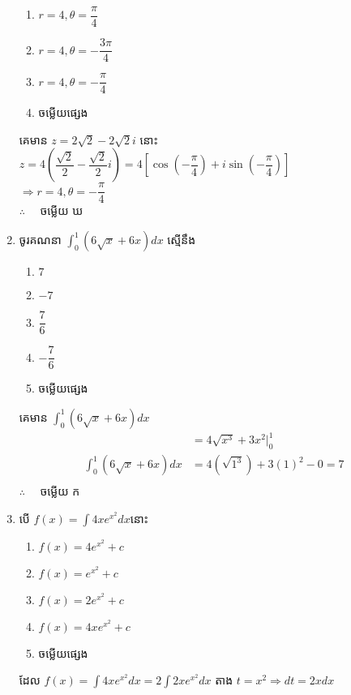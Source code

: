 \documentclass[a4paper,12pt]{article}
\begin{document}
\begin{enumerate}[m]
\begin{enumerate}[k,3]
			\item $r=4,\theta=\dfrac{\pi}{4}$
			\item $r=4,\theta=-\dfrac{3\pi}{4}$
			\item $r=4,\theta=-\dfrac{\pi}{4}$
			\item ចម្លើយផ្សេង
		\end{enumerate}
		\answer
		\begin{center}
			គេមាន $z=2\sqrt{2}-2\sqrt{2}i$ នោះ $z=4\left(\dfrac{\sqrt{2}}{2}-\dfrac{\sqrt{2}}{2}i\right)=4\left[\cos\left(-\dfrac{\pi}{4}\right)+i\sin\left(-\dfrac{\pi}{4}\right)\right]$\\
			$\Rightarrow r=4, \theta=-\dfrac{\pi}{4}$\\
			$\therefore \quad$ \kml ចម្លើយ \kbk ឃ
		\end{center}
		{\color{blue}\hrulefill}
	\item ចូរគណនា $\int_{0}^{1}\left(6\sqrt{x}+6x\right)dx$ ស្មើនឹង
	\begin{enumerate}[k,5]
		\item $7$
		\item $-7$
		\item $\dfrac{7}{6}$
		\item $-\dfrac{7}{6}$
		\item ចម្លើយផ្សេង
	\end{enumerate}
	\answer
	\begin{center}
		គេមាន $\int_{0}^{1}\left(6\sqrt{x}+6x\right)dx$\\
		\begin{align*}
			&=4\sqrt{x^3}+3x^2\bigg|_{0}^{1}\\
			\int_{0}^{1}\left(6\sqrt{x}+6x\right)dx&=4\left(\sqrt{1^3}\right)+3\left(1\right)^2-0=7\\
		\end{align*}
		$\therefore \quad$ \kml ចម្លើយ \kbk ក
	\end{center}
	{\color{blue}\hrulefill}
	\item បើ $f(x)=\int4xe^{x^2}dx$នោះ
		\begin{enumerate}[k,3]
			\item $f(x)=4e^{x^2}+c$
			\item $f(x)=e^{x^2}+c$
			\item $f(x)=2e^{x^2}+c$
			\item $f(x)=4xe^{x^2}+c$
			\item ចម្លើយផ្សេង
		\end{enumerate}
		\answer
		\begin{center}
			 ដែល $f(x)=\int4xe^{x^2}dx=2\int2xe^{x^2}dx$ តាង $t = x^2 \Rightarrow dt=2xdx$\\

\end{center}
\end{enumerate}
\end{document}
